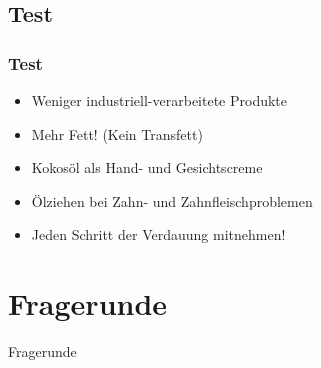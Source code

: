 \documentclass[xcolor=dvipsnames]{beamer}
\begin{document}
    \subsection{Test}
    \begin{frame}
        \frametitle{Test}

        \begin{itemize}
            \setlength\itemsep{1em}
            \item Weniger industriell-verarbeitete Produkte
            \item Mehr Fett! (Kein Transfett)
            \item Kokosöl als Hand- und Gesichtscreme
            \item Ölziehen bei Zahn- und Zahnfleischproblemen
            \item Jeden Schritt der Verdauung mitnehmen!
        \end{itemize}
    \end{frame}

    \section{Fragerunde}
    {
        \begin{frame}
            \begin{center}
                \Huge Fragerunde
            \end{center}
        \end{frame}
    }
\end{document}
